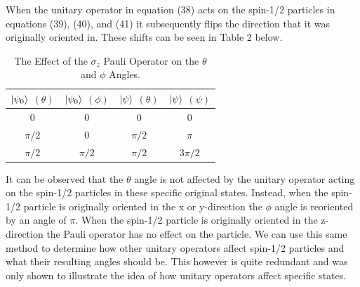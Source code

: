 \documentclass[twocolumn]{article}
\begin{document}
When the unitary operator in equation (38) acts on the spin-1/2 particles in equations (39), (40), and (41) it subsequently flips the direction that it was originally oriented in. These shifts can be seen in Table 2 below.
\begin{table}[h!]
\begin{center}
\begin{tabular}{ |c|c|c|c| }
\hline $\ket{\psi_0}$ $(\theta)$& $\ket{\psi_0}$ $(\phi)$& $\ket{\psi}$ $(\theta)$& $\ket{\psi}$ $(\psi)$ \\
\hline 0 & 0 & 0 & 0 \\
\hline $\pi/2$ & 0 & $\pi/2$ & $\pi$ \\
\hline $\pi/2$ & $\pi/2$ & $\pi/2$ & $3\pi/2$ \\
\hline
\end{tabular}
\caption{The Effect of the $\sigma_z$ Pauli Operator on the $\theta$ and $\phi$ Angles.}
\end{center}
\end{table} 

It can be observed that the $\theta$ angle is not affected by the unitary operator acting on the spin-1/2 particles in these specific original states. Instead, when the spin-1/2 particle is originally oriented in the x or y-direction the $\phi$ angle is reoriented by an angle of $\pi$. When the spin-1/2 particle is originally oriented in the z-direction the Pauli operator has no effect on the particle. We can use this same method to determine how other unitary operators affect spin-1/2 particles and what their resulting angles should be. This however is quite redundant and was only shown to illustrate the idea of how unitary operators affect specific states.
\end{document}

